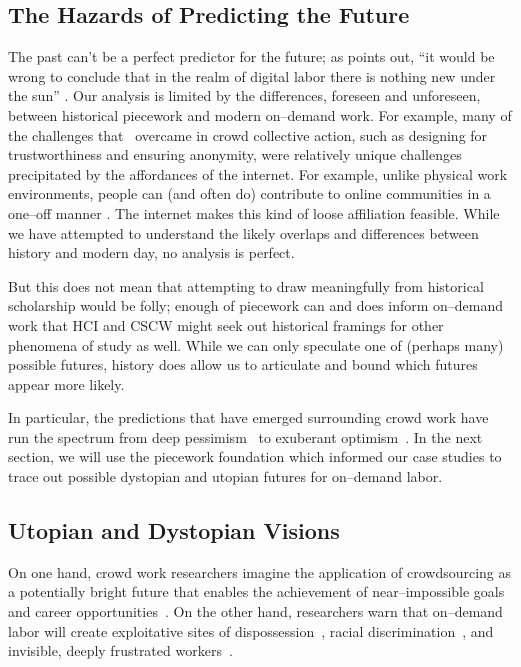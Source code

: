 \documentclass[trackingWork]{subfiles}
\begin{document}
\subsection{The Hazards of Predicting the Future}\label{sec:perilousProblemsPredicting}
The past can't be a perfect predictor for the future;
as \citeauthor{scholz2012digital} points out,
``it would be wrong to conclude that
in the realm of digital labor
there is nothing new under the sun''
\cite{scholz2012digital}.
Our analysis is limited by the differences, foreseen and unforeseen, between historical piecework and modern on--demand work.
For example, many of the challenges that \DO~overcame in crowd collective action, such as designing for trustworthiness and ensuring anonymity, were relatively unique challenges precipitated by the affordances of the internet.
For example, unlike physical work environments, people can (and often do) contribute to online communities in a one--off manner
\cite{mcinnis2016one}.
The internet makes this kind of loose affiliation feasible.
While we have attempted to understand the likely overlaps and differences between history and modern day, no analysis is perfect.


But this does not mean that
attempting to draw meaningfully from historical scholarship would be folly;
enough of piecework can and does inform on--demand work that
HCI and CSCW might seek out historical framings for other phenomena of study as well.
While we can only speculate one of (perhaps many) possible futures, history does allow us to articulate and bound which futures appear more likely.

In particular, the predictions that have emerged surrounding crowd work have run the spectrum
from deep pessimism~\cite{fort2011amazon} to exuberant optimism~\cite{crowdworkFuture}.
In the next section, we will use
the piecework foundation which informed our case studies
to trace out possible dystopian and utopian futures for on--demand labor.


\subsection{Utopian and Dystopian Visions}\label{sec:polarizationOfCrowdWork}
On one hand, crowd work researchers
imagine the application of crowdsourcing as
a potentially bright future that enables the achievement of near--impossible goals and career opportunities~\cite{redballoon,crowdworkFuture,vizwiz,suzukiAtelier}.
On the other hand, researchers
warn that on--demand labor will create exploitative sites of dispossession~\cite{scholz2012digital},
racial discrimination~\cite{edelman2015racial},
and invisible, deeply frustrated workers~\cite{turkopticon,bighamHalfWorkday}.
\end{document}

